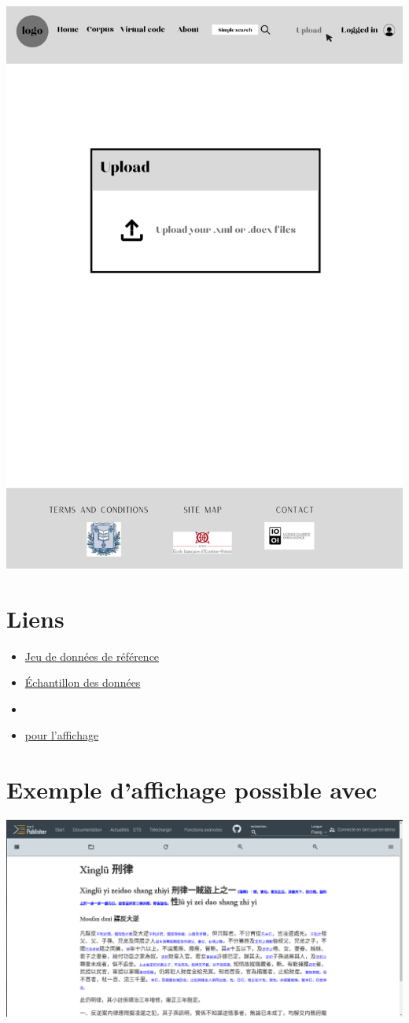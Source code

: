 \noindent \includegraphics[width=\textwidth]{annexes/14 - Télécharger de nouveaux documents.png}

\section*{Liens}
\begin{itemize}
    \item 
\href{https://sharedocs.huma-num.fr/wl/?id=yHHcUPKWyusazIZqWVLgtbZI7J65OaLA&path=TEI%282%29&mode=grid}{Jeu de données \TEI de référence}
\item 
\href{}{Échantillon des données}
\item 
\href{https://sharedocs.huma-num.fr/wl/?id=yHHcUPKWyusazIZqWVLgtbZI7J65OaLA&path=ODD&mode=grid}{\ODD}
\item 
\href{}{\ODD pour l'affichage \tp}
\end{itemize}
\section*{Exemple d'affichage possible avec \tp}
\noindent \includegraphics[width=\textwidth]{annexes/affichage.png}